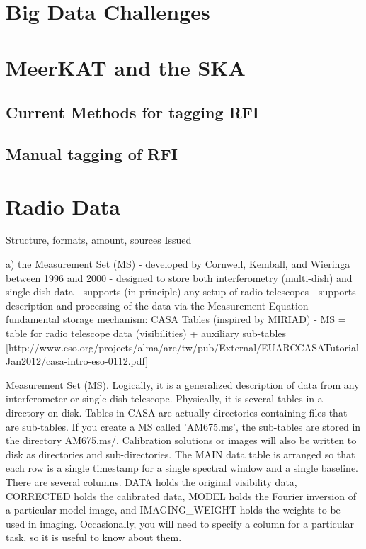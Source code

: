 \section{Big Data Challenges}
\section{MeerKAT and the SKA}
\subsection{Current Methods for tagging RFI}

\subsection{Manual tagging of RFI}





\section{Radio Data}
Structure, formats, amount, sources
Issued

a) the Measurement Set (MS)
- developed by Cornwell, Kemball, and Wieringa between 1996 and 2000
- designed to store both interferometry (multi-dish) and single-dish data
- supports (in principle) any setup of radio telescopes
- supports description and processing of the data via the Measurement Equation
- fundamental storage mechanism: CASA Tables (inspired by MIRIAD)
- MS = table for radio telescope data (visibilities) + auxiliary sub-tables 
[http://www.eso.org/projects/alma/arc/tw/pub/External/EUARCCASATutorialJan2012/casa-intro-eso-0112.pdf]



Measurement Set (MS). Logically, it is a generalized description of data from any interferometer or single-dish telescope. Physically, it is several tables in a directory on disk. Tables in CASA are actually directories containing files that are sub-tables. If you create a MS called 'AM675.ms', the sub-tables are stored in the directory AM675.ms/. Calibration solutions or images will also be written to disk as directories and sub-directories.
The MAIN data table is arranged so that each row is a single timestamp for a single spectral window and a single baseline. 
There are several columns. DATA holds the original visibility data, CORRECTED holds the calibrated data, MODEL holds the Fourier inversion of a particular model image, and IMAGING\_WEIGHT holds the weights to be used in imaging.
Occasionally, you will need to specify a column for a particular task, so it is useful to know about them.


